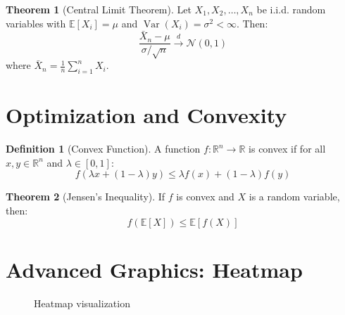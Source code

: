 \documentclass[11pt,a4paper]{article}
\theoremstyle{definition}
\newtheorem{definition}{Definition}[section]
\newtheorem{theorem}{Theorem}[section]
\newcommand{\E}{\mathbb{E}}
\newcommand{\N}{\mathcal{N}}
\DeclareMathOperator{\Var}{Var}
\begin{document}
\begin{theorem}[Central Limit Theorem]
Let $X_1, X_2, \ldots, X_n$ be i.i.d. random variables with $\E[X_i] = \mu$ and $\Var(X_i) = \sigma^2 < \infty$. Then:
\begin{equation}
    \frac{\bar{X}_n - \mu}{\sigma/\sqrt{n}} \xrightarrow{d} \N(0,1)
\end{equation}
where $\bar{X}_n = \frac{1}{n}\sum_{i=1}^n X_i$.
\end{theorem}

\section{Optimization and Convexity}

\begin{definition}[Convex Function]
A function $f: \mathbb{R}^n \to \mathbb{R}$ is convex if for all $x, y \in \mathbb{R}^n$ and $\lambda \in [0,1]$:
\begin{equation}
    f(\lambda x + (1-\lambda)y) \leq \lambda f(x) + (1-\lambda)f(y)
\end{equation}
\end{definition}

\begin{theorem}[Jensen's Inequality]
If $f$ is convex and $X$ is a random variable, then:
\begin{equation}
    f(\E[X]) \leq \E[f(X)]
\end{equation}
\end{theorem}

\section{Advanced Graphics: Heatmap}

\begin{figure}[H]
\centering
{}
\caption{Heatmap visualization}
\label{fig:heatmap}
\end{figure}
\end{document}
